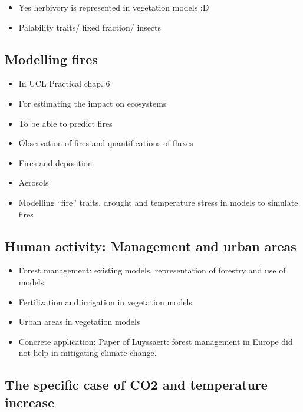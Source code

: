 \documentclass[12pt,oneside]{book}
\providecommand{\tightlist}{%
  \setlength{\itemsep}{0pt}\setlength{\parskip}{0pt}}
\begin{document}
\begin{itemize}
\tightlist
\item
  Yes herbivory is represented in vegetation models :D
\item
  Palability traits/ fixed fraction/ insects
\end{itemize}

\subsection{Modelling fires}\label{modelling-fires}

\begin{itemize}
\tightlist
\item
  In UCL Practical chap. 6
\item
  For estimating the impact on ecosystems
\item
  To be able to predict fires
\item
  Observation of fires and quantifications of fluxes
\item
  Fires and deposition
\item
  Aerosols
\item
  Modelling ``fire'' traits, drought and temperature stress in models to
  simulate fires
\end{itemize}

\subsection{Human activity: Management and urban
areas}\label{human-activity-management-and-urban-areas}

\begin{itemize}
\tightlist
\item
  Forest management: existing models, representation of forestry and use
  of models
\item
  Fertilization and irrigation in vegetation models
\item
  Urban areas in vegetation models
\item
  Concrete application: Paper of Luyssaert: forest management in Europe
  did not help in mitigating climate change.
\end{itemize}

\subsection{The specific case of CO2 and temperature
increase}\label{the-specific-case-of-co2-and-temperature-increase}
\end{document}
